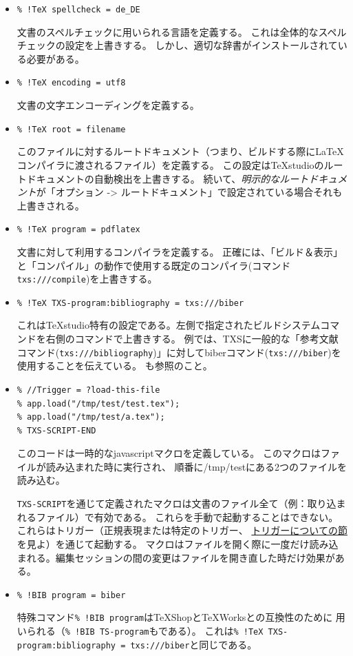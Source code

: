 \begin{itemize}
\item
  \lstinline"% !TeX spellcheck = de_DE"

  文書のスペルチェックに用いられる言語を定義する。
  これは全体的なスペルチェックの設定を上書きする。 しかし、適切な辞書がインストールされている必要がある。
\item
  \lstinline"% !TeX encoding = utf8"

  文書の文字エンコーディングを定義する。
\item
  \lstinline"% !TeX root = filename"

  このファイルに対するルートドキュメント（つまり、ビルドする際にLaTeXコンパイラに渡されるファイル）を定義する。
  この設定はTeXstudioのルートドキュメントの自動検出を上書きする。
  続いて、\emph{明示的なルートドキュメント}が「オプション -> ルートドキュメント」で設定されている場合それも上書きされる。
\item
  \lstinline"% !TeX program = pdflatex"

   文書に対して利用するコンパイラを定義する。
   正確には、「ビルド＆表示」と「コンパイル」の動作で使用する既定のコンパイラ(コマンド\verb+txs:///compile+)を上書きする。
\item
  \lstinline"% !TeX TXS-program:bibliography = txs:///biber"

  これはTeXstudio特有の設定である。左側で指定されたビルドシステムコマンドを右側のコマンドで上書きする。
  例では、TXSに一般的な「参考文献コマンド(\verb+txs:///bibliography+)」に対してbiberコマンド(\verb+txs:///biber+)を使用することを伝えている。
  も参照のこと。
\item
\begin{lstlisting}[frame=single]
% !TeX TXS-SCRIPT = foobar
% //Trigger = ?load-this-file
% app.load("/tmp/test/test.tex");
% app.load("/tmp/test/a.tex");
% TXS-SCRIPT-END
\end{lstlisting}

  このコードは一時的なjavascriptマクロを定義している。
  このマクロはファイルが読み込まれた時に実行され、
  順番に/tmp/testにある2つのファイルを読み込む。

  \verb+TXS-SCRIPT+を通じて定義されたマクロは文書のファイル全て（例：取り込まれるファイル）で有効である。
  これらを手動で起動することはできない。
  これらはトリガー（正規表現または特定のトリガー、
  \hyperref[sec:triggers]{トリガーについての節}を見よ）を通じて起動する。
  マクロはファイルを開く際に一度だけ読み込まれる。編集セッションの間の変更はファイルを開き直した時だけ効果がある。

\item
  \lstinline"% !BIB program = biber"

  特殊コマンド\verb+% !BIB program+はTeXShopとTeXWorksとの互換性のために
  用いられる（\verb+% !BIB TS-program+もである）。
  これは\verb+% !TeX TXS-program:bibliography = txs:///biber+と同じである。

\end{itemize}

